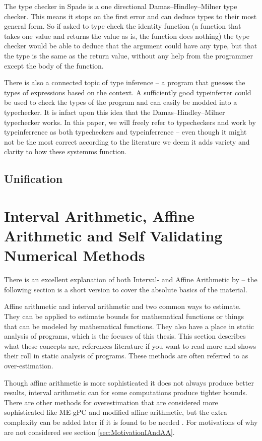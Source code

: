 The type checker in Spade is a one directional Damas–Hindley–Milner type checker. This means it stops on the first error and can deduce types to their most general form. So if asked to type check the identity function (a function that takes one value and returns the value as is, the function does nothing) the type checker would be able to deduce that the argument could have any type, but that the type is the same as the return value, without any help from the programmer except the body of the function. \cite{src:DamasHindleyMilner}

There is also a connected topic of type inference -- a program that guesses the types of expressions based on the context. A sufficiently good typeinferrer could be used to check the types of the program and can easily be modded into a typechecker. It is infact upon this idea that the Damas–Hindley–Milner typechecker works. In this paper, we will freely refer to typecheckers and work by typeinferrence as both typecheckers and typeinferrence -- even though it might not be the most correct according to the literature we deem it adds variety and clarity to how these systemms function.

\subsection{Unification}

\section{Interval Arithmetic, Affine Arithmetic and Self Validating Numerical Methods}
\label{sec:IAndAA}

There is an excellent explanation of both Interval- and Affine Arithmetic by \citeauthor{src:affAri} -- the following section is a short version to cover the absolute basics of the material.

Affine arithmetic and interval arithmetic and two common ways to estimate. They can be applied to estimate bounds for mathematical functions or things that can be modeled by mathematical functions. They also have a place in static analysis of programs, which is the focuses of this thesis. This section describes what these concepts are, references literature if you want to read more and shows their roll in static analysis of programs. These methods are often referred to as over-estimation.

Though affine arithmetic is more sophisticated it does not always produce better results, interval arithmetic can for some computations produce tighter bounds. There are other methods for overestimation that are considered more sophisticated like ME-gPC and modified affine arithmetic, but the extra complexity can be added later if it is found to be needed \cite{src:MEgPC}. For motivations of why are not considered see section \ref{sec:MotivationIAndAA}.

